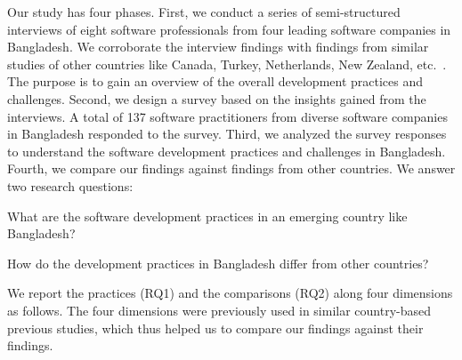 Our study has four phases. First, we conduct a series of semi-structured interviews of eight software professionals from four 
leading software companies in Bangladesh. We corroborate the interview findings with findings from similar studies of 
other countries like 
Canada, Turkey, Netherlands, New Zealand, etc.~\cite{Garousi2013, Garousi2015, Vonken2012, Wang2018}. 
The purpose is to gain an overview of the overall development practices and challenges. 
Second, we design a survey based on the insights gained from the interviews. A total of 137 
software practitioners from diverse software companies in Bangladesh responded to the survey. Third, 
we analyzed the survey responses to understand the software development practices and challenges in Bangladesh. Fourth, 
we compare our findings against findings from other countries. We answer two research questions:
\begin{inparaenum}[(RQ1)]
  \item What are the software development practices in an emerging country like Bangladesh?
  \item How do the development practices in Bangladesh differ from other countries?
\end{inparaenum} We report the practices (RQ1) and the comparisons (RQ2) along four dimensions as follows. The four dimensions 
were previously used in similar country-based previous studies, which thus helped us to compare our findings against their findings.

